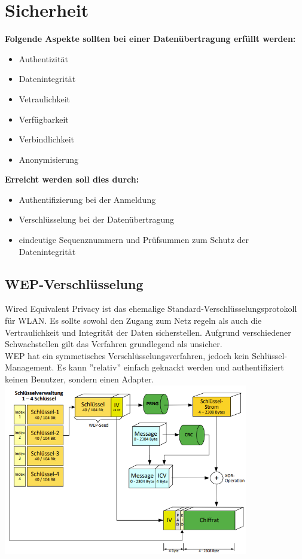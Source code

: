 \documentclass[12pt,a4paper]{article}
\begin{document}
\section{Sicherheit}
	\textbf{Folgende Aspekte sollten bei einer Datenübertragung erfüllt werden:}
	\begin{itemize}
		\setlength\itemsep{0cm}
		\item Authentizität
		\item Datenintegrität
		\item Vetraulichkeit
		\item Verfügbarkeit
		\item Verbindlichkeit
		\item Anonymisierung
	\end{itemize}
	\textbf{Erreicht werden soll dies durch:}
	\begin{itemize}
		\setlength\itemsep{0cm}
		\item Authentifizierung bei der Anmeldung
		\item Verschlüsselung bei der Datenübertragung 
		\item eindeutige Sequenznummern und Prüfsummen zum Schutz der Datenintegrität
	\end{itemize}
	
	\subsection{WEP-Verschlüsselung}
		Wired Equivalent Privacy ist das ehemalige Standard-Verschlüsselungsprotokoll für WLAN. 
		Es sollte sowohl den Zugang zum Netz regeln als auch die Vertraulichkeit und Integrität der Daten sicherstellen. 
		Aufgrund verschiedener Schwachstellen gilt das Verfahren grundlegend als unsicher.\\
		WEP hat ein symmetisches Verschlüsselungsverfahren, jedoch kein Schlüssel-Management. 
		Es kann ''relativ'' einfach geknackt werden und authentifiziert keinen Benutzer, sondern einen Adapter.\\
		\includegraphics[width=0.8\textwidth]{Bilder/wep.PNG}
\end{document}
